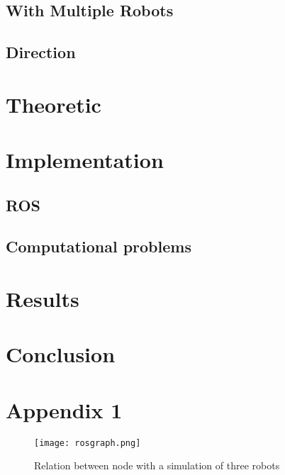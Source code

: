 \documentclass[12pt]{report} %
\begin{document}
\section{With Multiple Robots}

\section{Direction}


\chapter{Theoretic}

\chapter{Implementation}
\section{ROS}

\section{Computational problems}

\chapter{Results}\label{ch:results}

\chapter*{Conclusion}

\chapter{Appendix 1}

\begin{figure}[H]
\centering
\texttt{[image: rosgraph.png]}
\caption{Relation between node with a simulation of three robots}
\label{fig:completeNode}
\end{figure}


%


\nocite{*}




\end{document}
